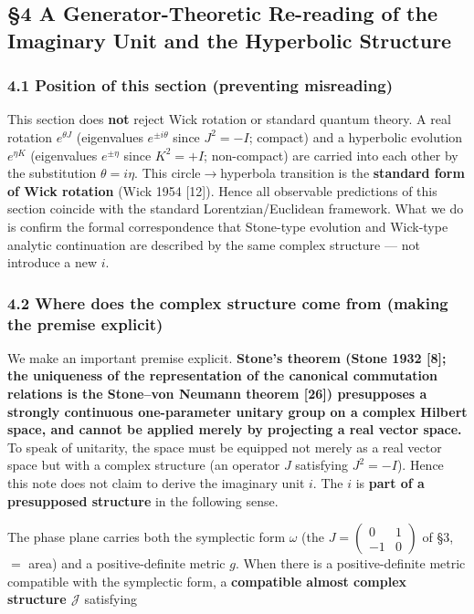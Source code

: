 \documentclass[
]{article}
\begin{document}
\subsection{§4 A Generator-Theoretic Re-reading of the Imaginary Unit
and the Hyperbolic
Structure}\label{a-generator-theoretic-re-reading-of-the-imaginary-unit-and-the-hyperbolic-structure}

\subsubsection{4.1 Position of this section (preventing
misreading)}\label{position-of-this-section-preventing-misreading}

This section does \textbf{not} reject Wick rotation or standard quantum
theory. A real rotation \(e^{\theta J}\) (eigenvalues
\(e^{\pm i\theta}\) since \(J^2=-I\); compact) and a hyperbolic
evolution \(e^{\eta K}\) (eigenvalues \(e^{\pm\eta}\) since \(K^2=+I\);
non-compact) are carried into each other by the substitution
\(\theta=i\eta\). This circle\(\to\)hyperbola transition is the
\textbf{standard form of Wick rotation} (Wick 1954 {[}12{]}). Hence all
observable predictions of this section coincide with the standard
Lorentzian/Euclidean framework. What we do is confirm the formal
correspondence that Stone-type evolution and Wick-type analytic
continuation are described by the same complex structure --- not
introduce a new \(i\).

\subsubsection{4.2 Where does the complex structure come from (making
the premise
explicit)}\label{where-does-the-complex-structure-come-from-making-the-premise-explicit}

We make an important premise explicit. \textbf{Stone's theorem (Stone
1932 {[}8{]}; the uniqueness of the representation of the canonical
commutation relations is the Stone--von Neumann theorem {[}26{]})
presupposes a strongly continuous one-parameter unitary group on a
complex Hilbert space, and cannot be applied merely by projecting a real
vector space.} To speak of unitarity, the space must be equipped not
merely as a real vector space but with a complex structure (an operator
\(J\) satisfying \(J^2=-I\)). Hence this note does not claim to derive
the imaginary unit \(i\). The \(i\) is \textbf{part of a presupposed
structure} in the following sense.

The phase plane carries both the symplectic form \(\omega\) (the
\(J=\begin{pmatrix}0&1\\-1&0\end{pmatrix}\) of §3, \(=\) area) and a
positive-definite metric \(g\). When there is a positive-definite metric
compatible with the symplectic form, a \textbf{compatible almost complex
structure \(\mathcal{J}\)} satisfying
\end{document}
